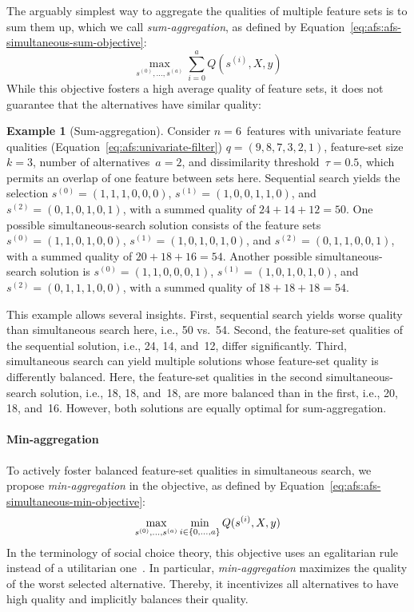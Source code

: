 \documentclass[iicol, sn-basic, Numbered]{sn-jnl} %
\theoremstyle{plain}
\theoremstyle{definition}
\newtheorem{example}{Example}
\begin{document}
\begin{appendices}
The arguably simplest way to aggregate the qualities of multiple feature sets is to sum them up, which we call \emph{sum-aggregation}, as defined by Equation~\ref{eq:afs:afs-simultaneous-sum-objective}:
%
\begin{equation}
	\max_{s^{(0)}, \dots, s^{(a)}} \sum_{i=0}^a Q(s^{(i)},X,y)
	\label{eq:afs:afs-simultaneous-sum-objective}
\end{equation}
%
While this objective fosters a high average quality of feature sets, it does not guarantee that the alternatives have similar quality:
%
\begin{example}[Sum-aggregation]
	Consider $n=6$~features with univariate feature qualities (Equation~\ref{eq:afs:univariate-filter}) $q = (9,8,7,3,2,1)$, feature-set size~$k=3$, number of alternatives~$a=2$, and dissimilarity threshold~$\tau = 0.5$, which permits an overlap of one feature between sets here.
	Sequential search yields the selection $s^{(0)} = (1,1,1,0,0,0)$, $s^{(1)} = (1,0,0,1,1,0)$, and $s^{(2)} = (0,1,0,1,0,1)$, with a summed quality of $24+14+12=50$.
	One possible simultaneous-search solution consists of the feature sets $s^{(0)} = (1,1,0,1,0,0)$, $s^{(1)} = (1,0,1,0,1,0)$, and $s^{(2)} = (0,1,1,0,0,1)$, with a summed quality of $20+18+16=54$.
	Another possible simultaneous-search solution is $s^{(0)} = (1,1,0,0,0,1)$, $s^{(1)} = (1,0,1,0,1,0)$, and $s^{(2)} = (0,1,1,1,0,0)$, with a summed quality of $18+18+18=54$.
	\label{ex:afs:sum-aggregation}
\end{example}
%
This example allows several insights.
First, sequential search yields worse quality than simultaneous search here, i.e., 50 vs.~54.
Second, the feature-set qualities of the sequential solution, i.e., 24, 14, and~12, differ significantly.
Third, simultaneous search can yield multiple solutions whose feature-set quality is differently balanced.
Here, the feature-set qualities in the second simultaneous-search solution, i.e., 18, 18, and~18, are more balanced than in the first, i.e., 20, 18, and~16.
However, both solutions are equally optimal for sum-aggregation.

\paragraph{Min-aggregation}

To actively foster balanced feature-set qualities in simultaneous search, we propose \emph{min-aggregation} in the objective, as defined by Equation~\ref{eq:afs:afs-simultaneous-min-objective}:
%
\begin{equation}
	\max_{s^{(0)}, \dots, s^{(a)}} \min_{i \in \{0, \dots, a\}} Q(s^{(i)},X,y) \\
	\label{eq:afs:afs-simultaneous-min-objective}
\end{equation}
%
In the terminology of social choice theory, this objective uses an egalitarian rule instead of a utilitarian one~\cite{myerson1981utilitarianism}.
In particular, \emph{min-aggregation} maximizes the quality of the worst selected alternative.
Thereby, it incentivizes all alternatives to have high quality and implicitly balances their quality.


\end{appendices}
\end{document}
